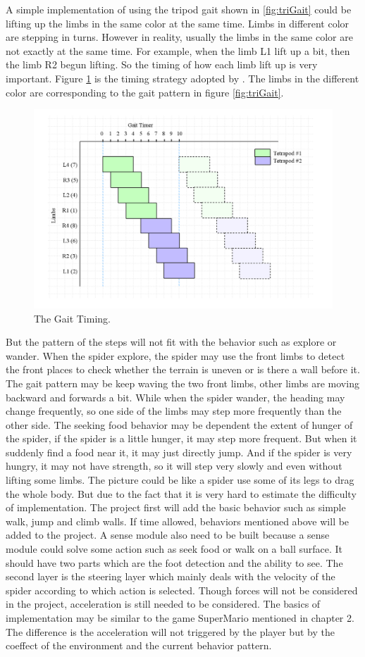 A simple implementation of using the tripod gait shown in \ref{fig:triGait} could be lifting up the limbs in the same color at the same time. Limbs in different color are stepping in turns. However in reality, usually the limbs in the same color are not exactly at the same time. For example, when the limb L1 lift up a bit, then the limb R2 begun lifting. So the timing of how each limb lift up is very important. Figure \ref{fig:gaitTiming} is the timing strategy adopted by \cite{thesis}. The limbs in the different color are corresponding to the gait pattern in figure \ref{fig:triGait}.
 \begin{figure}[ht!]
\centering
\includegraphics[height=6 cm]{figures/timing.png}
\caption{The Gait Timing. \protect\cite{thesis}}
\label{fig:gaitTiming}
\end{figure}
But the pattern of the steps will not fit with the behavior such as explore or wander. When the spider explore, the spider may use the front limbs to detect the front places to check whether the terrain is uneven or is there a wall before it. The gait pattern may be keep waving the two front limbs, other limbs are moving backward and forwards a bit. While when the spider wander, the heading may change frequently, so one side of the limbs may step more frequently than the other side. The seeking food behavior may be dependent the extent of hunger of the spider, if the spider is a little hunger, it may step more frequent. But when it suddenly find a food near it, it may just directly jump. And if the spider is very hungry, it may not have strength, so it will step very slowly and even without lifting some limbs. The picture could be like a spider use some of its legs to drag the whole body. But due to the fact that it is very hard to estimate the difficulty of implementation. The project first will add the basic behavior such as simple walk, jump and climb walls. If time allowed, behaviors mentioned above will be added to the project. 
A sense module also need to be built because a sense module could solve some action such as seek food or walk on a ball surface\cite{thesis}. It should have two parts which are the foot detection and the ability to see. The second layer is the steering layer which mainly deals with the velocity of the spider according to which action is selected. Though forces will not be considered in the project, acceleration is still needed to be considered. The basics of implementation may be similar to the game SuperMario mentioned in chapter 2. The difference is the acceleration will not triggered by the player but by the coeffect of the environment and the current behavior pattern.  
